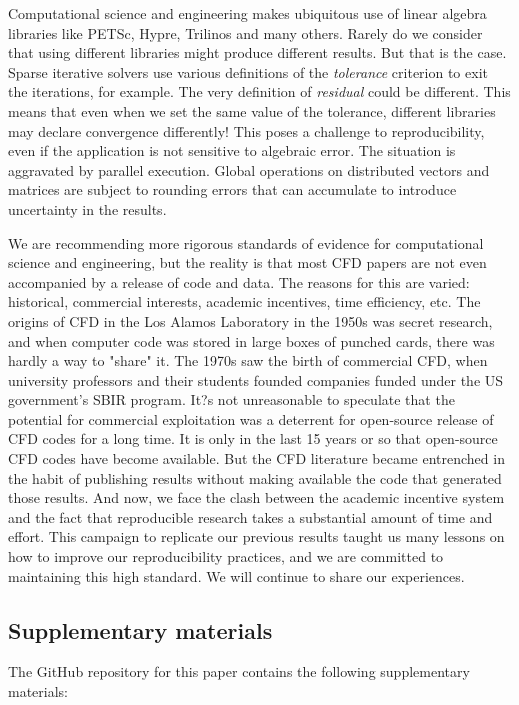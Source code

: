 \documentclass[9pt,twocolumn,twoside]{article}
\newlength{\up}
\begin{document}
Computational science and engineering makes ubiquitous use of linear algebra libraries like PETSc, Hypre, Trilinos and many others. 
Rarely do we consider that using different libraries might produce different results. 
But that is the case. 
Sparse iterative solvers use various definitions of the \textit{tolerance} criterion to exit the iterations, for example. 
The very definition of \textit{residual} could be different. 
This means that even when we set the same value of the tolerance, different libraries may declare convergence differently! 
This poses a challenge to reproducibility, even if the application is not sensitive to algebraic error. 
The situation is aggravated by parallel execution. 
Global operations on distributed vectors and matrices are subject to rounding errors that can accumulate to introduce uncertainty in the results. 

We are recommending more rigorous standards of evidence for computational science and engineering, but the reality is that most CFD papers are not even accompanied by a release of code and data. 
The reasons for this are varied: historical, commercial interests, academic incentives, time efficiency, etc. 
The origins of CFD in the Los Alamos Laboratory in the 1950s was secret research, and when computer code was stored in large boxes of punched cards, there was hardly a way to "share" it. 
The 1970s saw the birth of commercial CFD, when university professors and their students founded companies funded under the US government's SBIR program. 
It?s not unreasonable to speculate that the potential for commercial exploitation was a deterrent for open-source release of CFD codes for a long time. 
It is only in the last 15 years or so that open-source CFD codes have become available. 
But the CFD literature became entrenched in the habit of publishing results without making available the code that generated those results. 
And now, we face the clash between the academic incentive system and the fact that reproducible research takes a substantial amount of time and effort. 
This campaign to replicate our previous results taught us many lessons on how to improve our reproducibility practices, and we are committed to maintaining this high standard. 
We will continue to share our experiences.



 \subsection*{Supplementary materials}
 The GitHub repository for this paper contains the following supplementary materials:
 
\end{document}
